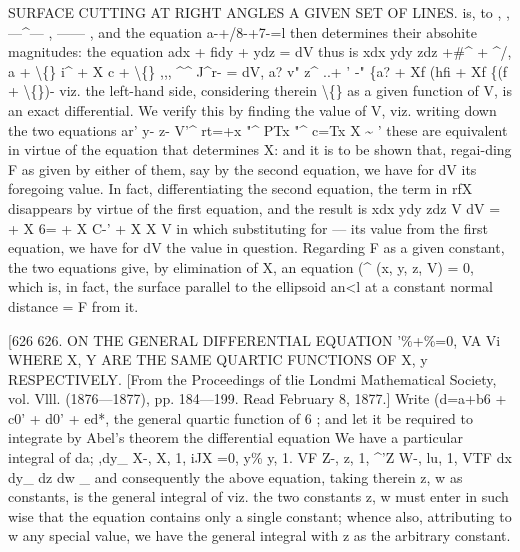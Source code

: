 \documentclass[11pt,a4paper]{book}
\begin{document}
SURFACE CUTTING AT RIGHT ANGLES A GIVEN SET OF LINES.
is,
to
,
,---\textasciicircum{}---
,
------
,
and
the
equation
a-+/8-+7-=l
then
determines
their
absohite magnitudes:
the equation adx + fidy + \textbullet{}ydz = dV thus
is
xdx
ydy
zdz
+\#\textasciicircum{} +
\textasciicircum{}/,
a\guillemotright{} + \textbackslash\{\}
i\textasciicircum{} + X
c\guillemotright{} + \textbackslash\{\}
,,,
\textasciicircum{}\textasciicircum{}
J\textasciicircum{}r- = dV,
a?
v"
z\textasciicircum{}
..+
'
-"
\{a? + Xf
(hfi + Xf
\{(f + \textbackslash\{\})-
viz.
the
left-hand
side,
considering
therein
\textbackslash\{\}
as
a
given
function
of
V,
is
an
exact
differential.
We
verify
this
by
finding
the
value
of
V,
viz.
writing
down
the
two
equations
ar'
y-
z-
V'\textasciicircum{}
rt=+x
"\textasciicircum{} PTx
"\textasciicircum{} c=Tx
X \textasciitilde{}
'
these
are
equivalent
in
virtue
of
the
equation
that
determines
X:
and
it
is
to
be
shown
that,
regai-ding F
as
given
by
either
of them, say by the
second
equation, we
have
for dV
its
foregoing
value.
In
fact,
differentiating
the
second
equation,
the
term
in
rfX disappears by virtue of the
first equation, and the
result
is
xdx
ydy
zdz
V dV
\guillemotleft{}= + X
6= + X
C-' + X
X
V
in
which
substituting
for
---
its
value
from
the
first
equation, we
have
for dV
the
value
in
question.
Regarding F
as
a
given
constant,
the
two
equations
give,
by
elimination
of
X, an
equation
(\textasciicircum{} (x,
y,
z, V) = 0,
which
is,
in
fact,
the
surface
parallel
to the
ellipsoid
an<l
at a constant normal distance = F from
it.

[626
626.
ON
THE GENERAL
DIFFERENTIAL
EQUATION '\%+\%=0,
VA
Vi
WHERE
X, Y ARE THE SAME QUARTIC
FUNCTIONS OF
X, y RESPECTIVELY.
[From the Proceedings of tlie Londmi Mathematical
Society,
vol.
Vlll. (1876---1877),
pp. 184---199.
Read February
8,
1877.]
Write (d=a+b6 + c0' + d0' + ed*, the
general
quartic
function
of 6
;
and
let
it be
required
to integrate by Abel's theorem
the
differential equation
We have
a particular integral of
da; ,dy\_
X-,
X,
1,
iJX
=0,
y\%
y,
1.
VF
Z-,
z,
1,
\textasciicircum{}'Z
W-,
lu,
1,
VTF
dx
dy\_
dz
dw \_
and
consequently the
above
equation,
taking
therein
z, w
as
constants,
is
the
general
integral of
viz.
the
two
constants
z, w
must
enter
in
such
wise
that
the
equation
contains only
a
single
constant;
whence
also, attributing to w any
special
value, we have
the general
integral with z as the arbitrary constant.
\end{document}
